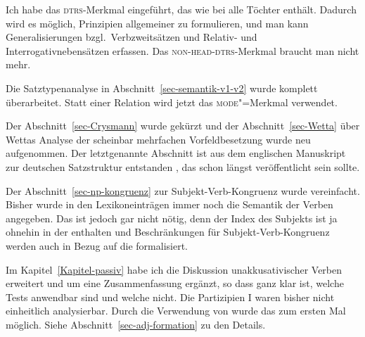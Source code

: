 Ich habe das \textsc{dtrs}-Merkmal eingeführt, das wie bei \citet[29--30]{GSag2000a-u} alle Töchter
enthält. Dadurch wird es möglich, Prinzipien allgemeiner zu formulieren, und man kann
Generalisierungen bzgl.\ Verbzweitsätzen und Relativ- und Interrogativnebensätzen erfassen. Das
\textsc{non-head-dtrs}-Merkmal braucht man nicht mehr.

Die Satztypenanalyse in Abschnitt~\ref{sec-semantik-v1-v2} wurde komplett überarbeitet. Statt einer Relation wird jetzt
das \textsc{mode}"=Merkmal verwendet.

Der Abschnitt~\ref{sec-Crysmann} wurde gekürzt und der Abschnitt~\ref{sec-Wetta} über Wettas Analyse der scheinbar mehrfachen
Vorfeldbesetzung wurde neu aufgenommen. Der letztgenannte Abschnitt ist aus dem englischen Manuskript zur
deutschen Satzstruktur entstanden \citep{MuellerGS}, das schon längst veröffentlicht sein sollte.

Der Abschnitt~\ref{sec-np-kongruenz} zur Subjekt-Verb-Kongruenz wurde vereinfacht. Bisher wurde in
den Lexikoneinträgen immer noch die Semantik der Verben angegeben. Das ist jedoch gar nicht nötig,
denn der Index des Subjekts ist ja ohnehin in der \argstl enthalten und Beschränkungen für
Subjekt-Verb-Kongruenz werden auch in Bezug auf die \argstl formalisiert.

Im Kapitel~\ref{Kapitel-passiv} habe ich die Diskussion unakkusativischer Verben erweitert und um
eine Zusammenfassung ergänzt, so dass ganz klar ist, welche Tests anwendbar sind und welche nicht.
Die Partizipien I waren bisher nicht einheitlich analysierbar. Durch die Verwendung von \argst wurde das zum
ersten Mal möglich. Siehe Abschnitt~\ref{sec-adj-formation} zu den Details.


%





